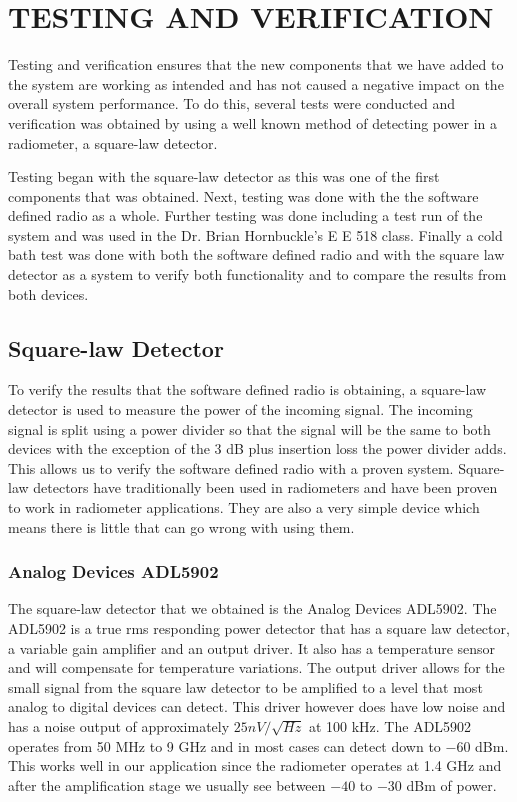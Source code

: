 \chapter{TESTING AND VERIFICATION}

Testing and verification ensures that the new components that we have added to the system are working as intended and has not caused a negative impact on the overall system performance.  To do this, several tests were conducted and verification was obtained by using a well known method of detecting power in a radiometer, a square-law detector.  

Testing began with the square-law detector as this was one of the first components that was obtained.  Next, testing was done with the the software defined radio as a whole.  Further testing was done including a test run of the system and was used in the Dr. Brian Hornbuckle's E E 518 class.  Finally a cold bath test was done with both the software defined radio and with the square law detector as a system to verify both functionality and to compare the results from both devices.  

\section{Square-law Detector}
To verify the results that the software defined radio is obtaining, a square-law detector is used to measure the power of the incoming signal.  The incoming signal is split using a power divider so that the signal will be the same to both devices with the exception of the 3 dB plus insertion loss the power divider adds.  This allows us to verify the software defined radio with a proven system.  Square-law detectors have traditionally been used in radiometers and have been proven to work in radiometer applications.  They are also a very simple device which means there is little that can go wrong with using them.


\subsection{Analog Devices ADL5902}

The square-law detector that we obtained is the Analog Devices ADL5902.  The ADL5902 is a true rms responding power detector that has a square law detector, a variable gain amplifier and an output driver. It also has a temperature sensor and will compensate for temperature variations.  The output driver allows for the small signal from the square law detector to be amplified to a level that most analog to digital devices can detect.  This driver however does have low noise and has a noise output of approximately $25nV/ \sqrt{Hz}$ at 100 kHz.  The ADL5902 operates from 50 MHz to 9 GHz and in most cases can detect down to $-60$ dBm.  This works well in our application since the radiometer operates at 1.4 GHz and after the amplification stage we usually see between $-40$ to $-30$ dBm of power.  

